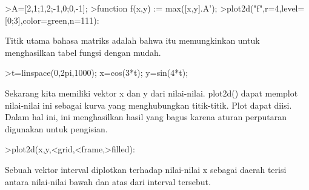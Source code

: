 \documentclass[a4paper,10pt]{article}
\begin{document}
\begin{eulernotebook}
\begin{eulercomment}
\begin{eulercomment}
\begin{eulercomment}
\begin{eulercomment}
\begin{eulercomment}
\begin{eulercomment}
\begin{eulerprompt}
>A=[2,1;1,2;-1,0;0,-1];
>function f(x,y) := max([x,y].A');
>plot2d("f",r=4,level=[0;3],color=green,n=111):
\end{eulerprompt}
\begin{eulercomment}
Titik utama bahasa matriks adalah bahwa itu memungkinkan untuk
menghasilkan tabel fungsi dengan mudah.
\end{eulercomment}
\begin{eulerprompt}
>t=linspace(0,2pi,1000); x=cos(3*t); y=sin(4*t);
\end{eulerprompt}
\begin{eulercomment}
Sekarang kita memiliki vektor x dan y dari nilai-nilai. plot2d() dapat
memplot nilai-nilai ini sebagai kurva yang menghubungkan titik-titik.
Plot dapat diisi. Dalam hal ini, ini menghasilkan hasil yang bagus
karena aturan perputaran digunakan untuk pengisian.
\end{eulercomment}
\begin{eulerprompt}
>plot2d(x,y,<grid,<frame,>filled):
\end{eulerprompt}
\begin{eulercomment}
Sebuah vektor interval diplotkan terhadap nilai-nilai x sebagai daerah
terisi antara nilai-nilai bawah dan atas dari interval tersebut.


\end{eulercomment}
\end{eulercomment}
\end{eulercomment}
\end{eulercomment}
\end{eulercomment}
\end{eulercomment}
\end{eulercomment}
\end{eulernotebook}
\end{document}
